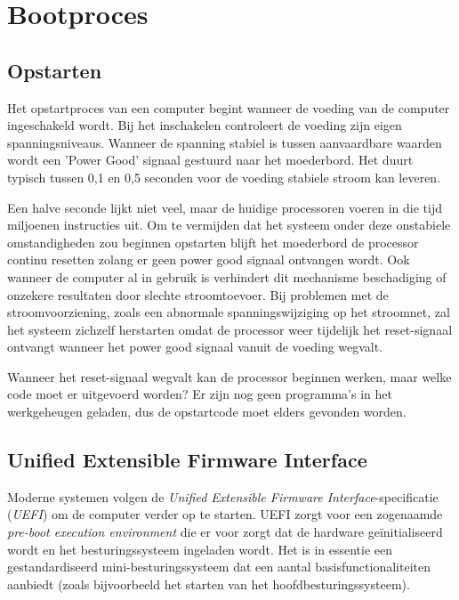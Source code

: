 \chapter{Bootproces}

\section{Opstarten}

Het opstartproces van een computer begint wanneer de voeding van
de computer ingeschakeld wordt. Bij het inschakelen controleert de
voeding zijn eigen spanningsniveaus. Wanneer de spanning stabiel is
tussen aanvaardbare waarden wordt een 'Power Good' signaal
gestuurd naar het moederbord. Het duurt typisch tussen 0,1 en 0,5
seconden voor de voeding stabiele stroom kan leveren.

Een halve seconde lijkt niet veel, maar de huidige processoren
voeren in die tijd miljoenen instructies uit. Om te vermijden dat het
systeem onder deze onstabiele omstandigheden zou beginnen opstarten
blijft het moederbord de processor continu resetten zolang er geen power
good signaal ontvangen wordt. Ook wanneer de computer al in gebruik is
verhindert dit mechanisme beschadiging of onzekere resultaten door
slechte stroomtoevoer. Bij problemen met de stroomvoorziening, zoals een
abnormale spanningswijziging op het stroomnet, zal het systeem zichzelf
herstarten omdat de processor weer tijdelijk het reset-signaal ontvangt
wanneer het power good signaal vanuit de voeding wegvalt.

Wanneer het reset-signaal wegvalt kan de processor beginnen
werken, maar welke code moet er uitgevoerd worden? Er zijn nog geen
programma's in het werkgeheugen geladen, dus de opstartcode moet elders
gevonden worden.

\section{Unified Extensible Firmware Interface}

Moderne systemen volgen de \emph{Unified Extensible Firmware Interface}-specificatie
(\emph{UEFI}) om de computer verder op te starten. UEFI zorgt voor een zogenaamde
\emph{pre-boot execution environment} die er voor zorgt dat de hardware ge\"initialiseerd
wordt en het besturingssysteem ingeladen wordt. Het is in essentie een gestandardiseerd
mini-besturingssysteem dat een aantal basisfunctionaliteiten aanbiedt (zoals bijvoorbeeld
het starten van het hoofdbesturingssysteem).

